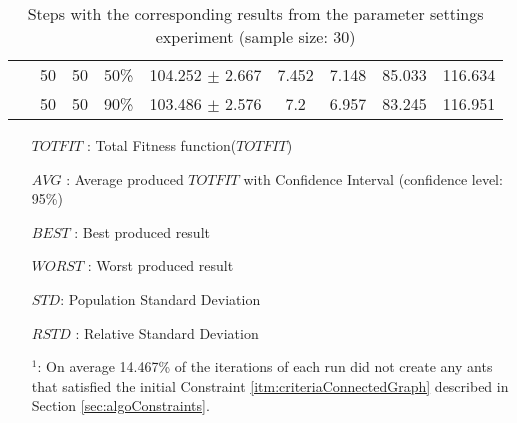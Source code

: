 \begin{sidewaystable}
\begin{tabular}{|l|l|l|c||c|c|c|c|c|}
    ~ & 50 & 50 & 50\% & 104.252 $\pm$ 2.667 & 7.452 & 7.148 & 85.033 & 116.634\\
    ~ & 50 & 50 & 90\% & 103.486 $\pm$ 2.576 & 7.2 & 6.957 & 83.245 & 116.951\\
    \hline
    \end{tabular}
    \caption {Steps with the corresponding results from the parameter settings experiment (sample size: 30)}
    \tiny
    \begin{itemize}[noitemsep]
    \item[$TOTFIT$ :] Total Fitness function($TOTFIT$)
    \item[$AVG$ :] Average produced $TOTFIT$ with Confidence Interval (confidence level: 95\%)
    \item[$BEST$ :] Best produced result
    \item[$WORST$ :] Worst produced result
    \item[$STD$:] Population Standard Deviation 
    \item[$RSTD$ :] Relative Standard Deviation 
    \item[$^1$:] On average 14.467\% of the iterations of each run did not create any ants that satisfied the initial Constraint \ref{itm:criteriaConnectedGraph} described in Section \vref{sec:algoConstraints}.
    \end{itemize}
    \label{table:pm1}
\end{sidewaystable}

